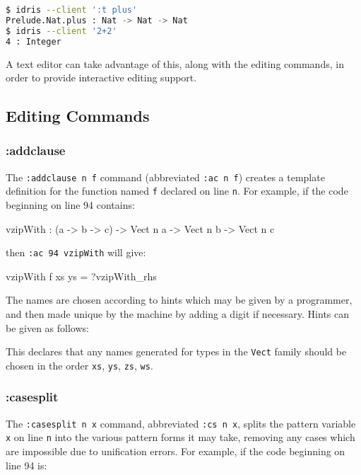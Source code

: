 \begin{lstlisting}[language=bash]
$ idris --client ':t plus'
Prelude.Nat.plus : Nat -> Nat -> Nat
$ idris --client '2+2'
4 : Integer
\end{lstlisting}

\noindent
A text editor can take advantage of this, along with the editing commands, in order to provide interactive editing support.

\subsection{Editing Commands}

\subsubsection{:addclause}

The \texttt{:addclause n f} command (abbreviated \texttt{:ac n f}) creates a template definition for the function named \texttt{f} declared on line \texttt{n}.
For example, if the code beginning on line 94 contains:

\begin{code}
vzipWith : (a -> b -> c) -> 
           Vect n a -> Vect n b -> Vect n c
\end{code}

\noindent
then \texttt{:ac 94 vzipWith} will give:

\begin{code}
vzipWith f xs ys = ?vzipWith_rhs
\end{code}

\noindent
The names are chosen according to hints which may be given by a programmer, and then made unique by the machine by adding a digit if necessary.
Hints can be given as follows:

\begin{code}
\end{code}

\noindent
This declares that any names generated for types in the \texttt{Vect} family should be chosen in the order \texttt{xs}, \texttt{ys}, \texttt{zs}, \texttt{ws}.

\subsubsection{:casesplit}

The \texttt{:casesplit n x} command, abbreviated \texttt{:cs n x}, splits the pattern variable \texttt{x} on line \texttt{n} into the various pattern forms it may take, removing any cases which are impossible due to unification errors.
For example, if the code beginning on line 94 is:

